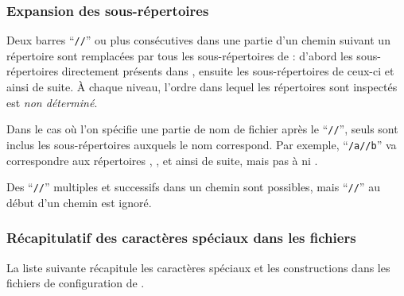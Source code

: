 \documentclass[german, english, french]{article}
\renewcommand{\samp}[1]{\enquote{\texttt{#1}}}
\begin{document}
\subsubsection{Expansion des sous-répertoires}
\label{sec:subdirectory-expansion}

Deux barres \samp{//} ou plus consécutives dans une partie d'un chemin suivant
un répertoire  sont remplacées par tous les sous-répertoires de  :
d'abord les sous-répertoires directement présents dans , ensuite les
sous-répertoires de ceux-ci et ainsi de suite. À chaque niveau, l'ordre dans
lequel les répertoires sont inspectés est \emph{non déterminé}.

Dans le cas où l'on spécifie une partie de nom de fichier après le \samp{//},
seuls sont inclus les sous-répertoires auxquels le nom correspond. Par exemple,
\samp{/a//b} va correspondre aux répertoires , ,
 et ainsi de suite, mais pas à  ni .

Des \samp{//} multiples et successifs dans un chemin sont possibles, mais
\samp{//} au début d'un chemin est ignoré.

\subsubsection{Récapitulatif des caractères spéciaux dans les fichiers
  }
\label{sec:cnf-special-chars}

La liste suivante récapitule les caractères spéciaux et les constructions dans
les fichiers de configuration de \KPS{}.

\newcommand{\CODE}[1]{\makebox[3em][l]{\code{#1}}}
\end{document}
